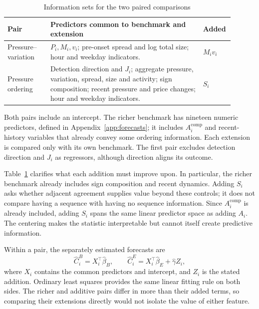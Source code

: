 \documentclass[12pt,letterpaper]{article}
\begin{document}
\begin{table}[htbp]\centering
\caption{Information sets for the two paired comparisons}\label{tab:information}
\begin{tabular}{>{\raggedright\arraybackslash}p{0.18\linewidth}>{\raggedright\arraybackslash}p{0.64\linewidth}p{0.08\linewidth}}\toprule
Pair & Predictors common to benchmark and extension & Added\\\midrule
Pressure--variation & $P_i,M_i,v_i$; pre-onset spread and log total size; hour and weekday indicators. & $M_iv_i$\\[4pt]
Pressure ordering & Detection direction and $J_i$; aggregate pressure, variation, spread, size and activity; sign composition; recent pressure and price changes; hour and weekday indicators. & $S_i$\\\bottomrule
\end{tabular}
\par\smallskip\begin{minipage}{0.94\linewidth}\footnotesize
Both pairs include an intercept. The richer benchmark has nineteen numeric predictors, defined in Appendix~\ref{app:forecasts}; it includes $A_i^{\mathrm{comp}}$ and recent-history variables that already convey some ordering information. Each extension is compared only with its own benchmark. The first pair excludes detection direction and $J_i$ as regressors, although direction aligns its outcome.
\end{minipage}\end{table}

Table~\ref{tab:information} clarifies what each addition must improve upon. In particular, the richer benchmark already includes sign composition and recent dynamics. Adding $S_i$ asks whether adjacent agreement supplies value beyond these controls; it does not compare having a sequence with having no sequence information. Since $A_i^{\mathrm{comp}}$ is already included, adding $S_i$ spans the same linear predictor space as adding $A_i$. The centering makes the statistic interpretable but cannot itself create predictive information.

Within a pair, the separately estimated forecasts are
\begin{equation}
\widehat C_i^B=X_i^\top\widehat\beta_B,
\qquad \widehat C_i^E=X_i^\top\widehat\beta_E+\widehat\gamma Z_i,
\label{eq:forecasts}\end{equation}
where $X_i$ contains the common predictors and intercept, and $Z_i$ is the stated addition. Ordinary least squares provides the same linear fitting rule on both sides. The richer and additive pairs differ in more than their added terms, so comparing their extensions directly would not isolate the value of either feature.
\end{document}

